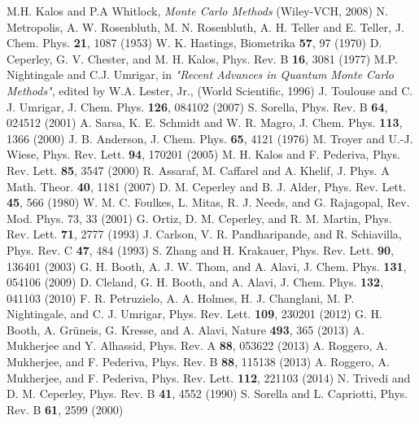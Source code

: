 \begin{thebibliography}{99.}%
M.H. Kalos and P.A Whitlock, {\em Monte Carlo Methods} (Wiley-VCH, 2008)
N. Metropolis, A. W. Rosenbluth, M. N. Rosenbluth, A. H. Teller and E. Teller,  J. Chem. Phys. {\bf 21}, 1087 (1953)
W. K. Hastings,  Biometrika {\bf 57}, 97 (1970)
D. Ceperley, G. V. Chester, and M. H. Kalos, Phys. Rev. B {\bf 16}, 3081 (1977)
M.P. Nightingale and C.J. Umrigar, in \emph{"Recent Advances in Quantum Monte Carlo Methods"}, edited by W.A. Lester, Jr., (World Scientific, 1996)
J. Toulouse and C. J. Umrigar,  J. Chem. Phys. {\bf 126}, 084102 (2007)
S. Sorella,  Phys. Rev. B {\bf 64}, 024512 (2001)
A. Sarsa, K. E. Schmidt and W. R. Magro, J. Chem. Phys. {\bf 113}, 1366 (2000)
J. B. Anderson,  J. Chem. Phys. {\bf 65}, 4121 (1976)
M. Troyer and U.-J. Wiese,  Phys. Rev. Lett. {\bf 94}, 170201 (2005)
M. H. Kalos and F. Pederiva, Phys. Rev. Lett. {\bf 85}, 3547 (2000)
R. Assaraf, M. Caffarel and A. Khelif,  J. Phys. A Math. Theor. {\bf 40}, 1181 (2007)
D. M. Ceperley and B. J. Alder, Phys. Rev. Lett. {\bf 45}, 566 (1980)
W. M. C. Foulkes, L. Mitas, R. J. Needs, and G. Rajagopal, Rev. Mod. Phys. 73, 33 (2001)
G. Ortiz, D. M. Ceperley, and R. M. Martin, Phys. Rev. Lett. {\bf 71}, 2777 (1993)
J. Carlson, V. R. Pandharipande, and R. Schiavilla,
Phys. Rev. C {\bf 47}, 484 (1993) 
S. Zhang and H. Krakauer,  Phys. Rev. Lett. {\bf 90}, 136401 (2003)
G. H. Booth, A. J. W. Thom, and A. Alavi,  J. Chem. Phys. {\bf 131}, 054106 (2009)
D. Cleland, G. H. Booth, and A. Alavi, J. Chem. Phys. {\bf 132}, 041103 (2010)
 F. R. Petruzielo, A. A. Holmes, H. J. Changlani, M. P.
Nightingale, and C. J. Umrigar, Phys. Rev. Lett. {\bf 109}, 230201 (2012)
G. H. Booth, A. Gr\"uneis, G. Kresse, and A. Alavi, Nature
{\bf 493}, 365 (2013)
A. Mukherjee and Y. Alhassid,  Phys. Rev. A {\bf 88}, 053622 (2013)
A. Roggero, A. Mukherjee, and F. Pederiva, Phys. Rev. B {\bf 88}, 115138 (2013)
A. Roggero, A. Mukherjee, and F. Pederiva, Phys. Rev. Lett. {\bf 112}, 221103 (2014)
N. Trivedi and D. M. Ceperley, Phys. Rev. B {\bf 41}, 4552 (1990)
S. Sorella and L. Capriotti,  Phys. Rev. B {\bf 61}, 2599 (2000)

\end{thebibliography}
